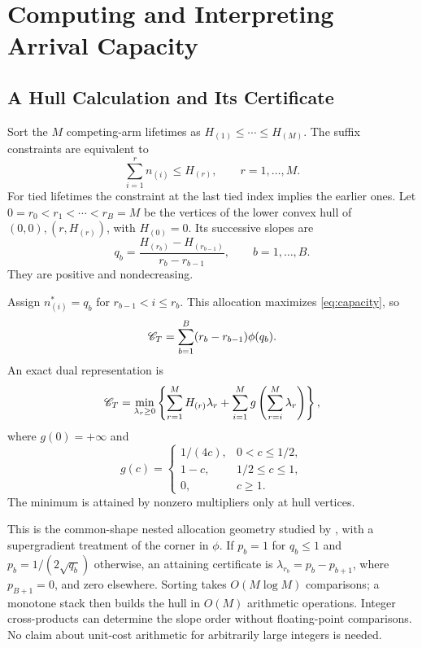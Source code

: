 \section{Computing and Interpreting Arrival Capacity}\label{sec:capacity-properties}
\subsection{A Hull Calculation and Its Certificate}
Sort the $M$ competing-arm lifetimes as $H_{(1)}\le\cdots\le H_{(M)}$. The suffix constraints are equivalent to
\[
 \sum_{i=1}^r n_{(i)}\le H_{(r)},\qquad r=1,\ldots,M.
\]
For tied lifetimes the constraint at the last tied index implies the earlier ones. Let $0=r_0<r_1<\cdots<r_B=M$ be the vertices of the lower convex hull of $(0,0),(r,H_{(r)})$, with $H_{(0)}=0$. Its successive slopes are
\begin{equation}\label{eq:hull-slopes}
 q_b=\frac{H_{(r_b)}-H_{(r_{b-1})}}{r_b-r_{b-1}},\qquad b=1,\ldots,B.
\end{equation}
They are positive and nondecreasing.

\begin{proposition}\label{prop:hull}
Assign $n_{(i)}^*=q_b$ for $r_{b-1}<i\le r_b$. This allocation maximizes \eqref{eq:capacity}, so
\begin{equation}\label{eq:hull-capacity}
 \mathscr C_T=\sum_{b=1}^B(r_b-r_{b-1})\phi(q_b).
\end{equation}
An exact dual representation is
\begin{equation}\label{eq:dual}
 \mathscr C_T=\min_{\lambda_r\ge0}\left\{
 \sum_{r=1}^M H_{(r)}\lambda_r+
 \sum_{i=1}^M g\left(\sum_{r=i}^M\lambda_r\right)\right\},
\end{equation}
where $g(0)=+\infty$ and
\[
 g(c)=
 \begin{cases}
 1/(4c),&0<c\le1/2,\\
 1-c,&1/2\le c\le1,\\
 0,&c\ge1.
 \end{cases}
\]
The minimum is attained by nonzero multipliers only at hull vertices.
\end{proposition}

This is the common-shape nested allocation geometry studied by \citet{vidal2016nested}, with a supergradient treatment of the corner in $\phi$. If $p_b=1$ for $q_b\le1$ and $p_b=1/(2\sqrt{q_b})$ otherwise, an attaining certificate is $\lambda_{r_b}=p_b-p_{b+1}$, where $p_{B+1}=0$, and zero elsewhere. Sorting takes $O(M\log M)$ comparisons; a monotone stack then builds the hull in $O(M)$ arithmetic operations. Integer cross-products can determine the slope order without floating-point comparisons. No claim about unit-cost arithmetic for arbitrarily large integers is needed.

